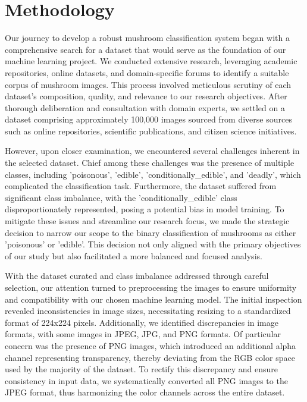 \section{Methodology}


Our journey to develop a robust mushroom classification system began with a comprehensive search for a dataset that would serve as the foundation of our machine learning project. We conducted extensive research, leveraging academic repositories, online datasets, and domain-specific forums to identify a suitable corpus of mushroom images. This process involved meticulous scrutiny of each dataset's composition, quality, and relevance to our research objectives. After thorough deliberation and consultation with domain experts, we settled on a dataset comprising approximately 100,000 images sourced from diverse sources such as online repositories, scientific publications, and citizen science initiatives.

However, upon closer examination, we encountered several challenges inherent in the selected dataset. Chief among these challenges was the presence of multiple classes, including 'poisonous', 'edible', 'conditionally_edible', and 'deadly', which complicated the classification task. Furthermore, the dataset suffered from significant class imbalance, with the 'conditionally_edible' class disproportionately represented, posing a potential bias in model training. To mitigate these issues and streamline our research focus, we made the strategic decision to narrow our scope to the binary classification of mushrooms as either 'poisonous' or 'edible'. This decision not only aligned with the primary objectives of our study but also facilitated a more balanced and focused analysis.

With the dataset curated and class imbalance addressed through careful selection, our attention turned to preprocessing the images to ensure uniformity and compatibility with our chosen machine learning model. The initial inspection revealed inconsistencies in image sizes, necessitating resizing to a standardized format of 224x224 pixels. Additionally, we identified discrepancies in image formats, with some images in JPEG, JPG, and PNG formats. Of particular concern was the presence of PNG images, which introduced an additional alpha channel representing transparency, thereby deviating from the RGB color space used by the majority of the dataset. To rectify this discrepancy and ensure consistency in input data, we systematically converted all PNG images to the JPEG format, thus harmonizing the color channels across the entire dataset.

